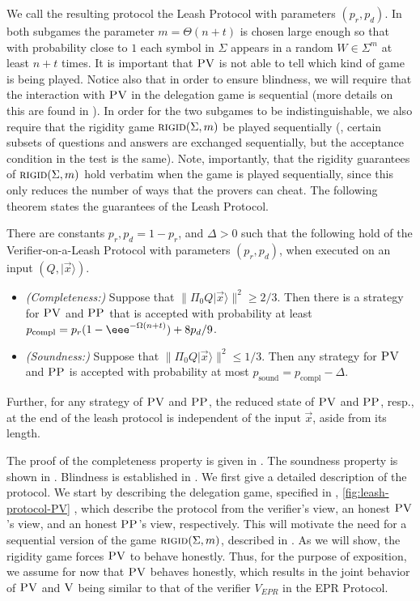 \documentclass{toc}
\newcommand{\ket}[1]{|#1\rangle}
\DeclareMathOperator{\sound}{sound}
\DeclareMathOperator{\compl}{compl}
\newcommand{\rigid}{\textsc{rigid}}
\newcommand{\ver}{\textsc{V}}
\newcommand{\pv}{\textsc{PV}}
\newcommand{\pp}{\textsc{PP}}
\begin{document}
We call the resulting protocol the Leash Protocol with parameters $(p_r,p_d)$. In both subgames the parameter $m=\Theta(n+t)$ is chosen large enough so that with probability close to $1$ each symbol in $\Sigma$ appears in a random $W\in \Sigma^m$ at least $n+t$ times. It is important that $\pv$ is not able to tell which kind of game is being played. Notice also that in order to ensure blindness, we will require that the interaction with $\pv$ in the delegation game is sequential (more details on this are found in ). In order for the two subgames to be indistinguishable, we also require that the rigidity game $\rigid(\Sigma,m)$ be played sequentially (\ie, certain subsets of questions and answers are exchanged sequentially, but the acceptance condition in the test is the same). Note, importantly, that the rigidity guarantees of $\rigid(\Sigma,m)$ hold verbatim when the game is played sequentially, since this only reduces the number of ways that the provers can cheat. The following theorem states the guarantees of the Leash Protocol.

\begin{theorem}\label{thm:leash}
There are constants $p_r,p_d=1-p_r$, and $\Delta>0$ such that the following hold of the Verifier-on-a-Leash Protocol with parameters $(p_r,p_d)$, when executed on an input $(Q,\ket{\vec{x}})$.
\begin{itemize}
\item \emph{(Completeness:)} Suppose that $\|\Pi_0 Q\ket{\vec{x}}\|^2 \geq 2/3$. Then there is a strategy for $\pv$ and $\pp$ that is accepted with probability at least $p_{\compl} = p_r(1-\eee^{-\Omega(n+t)})+8p_d/9$. 
\item \emph{(Soundness:)} Suppose that $\|\Pi_0 Q\ket{\vec{x}}\|^2 \leq 1/3$. Then any strategy for $\pv$ and $\pp$ is accepted with probability at most $p_{\sound} = p_{\compl} - \Delta$. 
\end{itemize}
Further, for any strategy of $\pv$ and $\pp$, the reduced state of $\pv$
%
and $\pp$, resp.,  %
at the end of the leash protocol is independent of the input $\vec{x}$, 
aside from its length.
\end{theorem}



The proof of the completeness property is given in . The soundness property is shown in . Blindness is established in . 
We first give a detailed description of the protocol. We start by describing the delegation game, specified in , \ref{fig:leash-protocol-PV} , which describe the protocol from the verifier's view, an honest $\pv$'s view, and an honest $\pp$'s
view, respectively. %
This will motivate the need for a sequential version of the game $\rigid(\Sigma,m)$, described in . As we will show, the rigidity game forces $\pv$ to behave honestly. Thus, for the purpose of exposition, we assume for now that $\pv$ behaves honestly, which results in the joint behavior of $\pv$ and $\ver$ being similar to that of the verifier $V_{EPR}$ in the EPR Protocol. 
\end{document}
